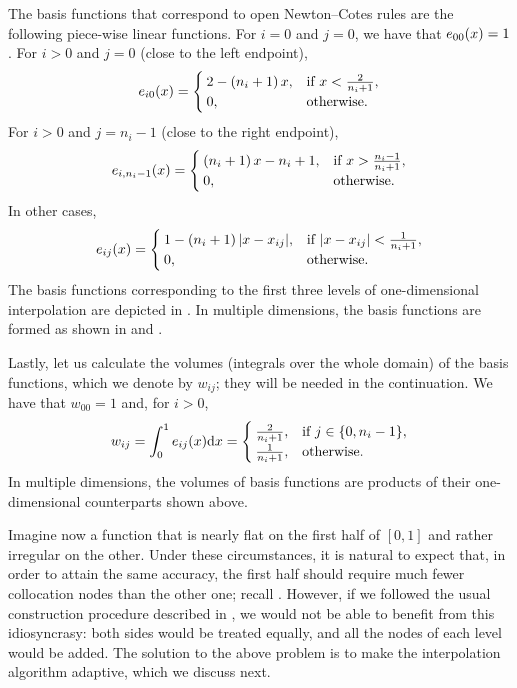 The basis functions that correspond to open Newton--Cotes rules are the
following piece-wise linear functions. For $i = 0$ and $j = 0$, we have that
$e_{00}(x) = 1$. For $i > 0$ and $j = 0$ (close to the left endpoint),
\[
  e_{i0}(x) =
  \begin{cases}
    2 - \left(n_i + 1\right) x, & \text{if } x < \frac{2}{n_i + 1}, \\
    0, & \text{otherwise}.
  \end{cases}
\]
For $i > 0$ and $j = n_i - 1$ (close to the right endpoint),
\[
  e_{i, n_i - 1}(x) =
  \begin{cases}
    \left(n_i + 1\right) x - n_i + 1, & \text{if } x > \frac{n_i - 1}{n_i + 1}, \\
    0, & \text{otherwise}.
  \end{cases}
\]
In other cases,
\[
  e_{ij}(x) =
  \begin{cases}
    1 - \left(n_i + 1\right)|x - x_{ij}|, & \text{if } |x - x_{ij}| < \frac{1}{n_i + 1}, \\
    0, & \text{otherwise}.
  \end{cases}
\]
The basis functions corresponding to the first three levels of one-dimensional
interpolation are depicted in . In multiple dimensions,
the basis functions are formed as shown in  and
.

Lastly, let us calculate the volumes (integrals over the whole domain) of the
basis functions, which we denote by $w_{ij}$; they will be needed in the
continuation. We have that $w_{00} = 1$ and, for $i > 0$,
\begin{equation} \elab{interpolant-basis-volume}
  w_{ij} = \int_0^1 e_{ij}(\x) \d \x =
  \begin{cases}
    \frac{2}{n_i + 1}, & \text{if } j \in \{ 0, n_i - 1 \}, \\
    \frac{1}{n_i + 1}, & \text{otherwise}.
  \end{cases}
\end{equation}
In multiple dimensions, the volumes of basis functions are products of
their one-dimensional counterparts shown above.

Imagine now a function that is nearly flat on the first half of $[0, 1]$ and
rather irregular on the other. Under these circumstances, it is natural to
expect that, in order to attain the same accuracy, the first half should require
much fewer collocation nodes than the other one; recall
. However, if we followed the usual construction
procedure described in , we would not be able to
benefit from this idiosyncrasy: both sides would be treated equally, and all the
nodes of each level would be added. The solution to the above problem is to make
the interpolation algorithm adaptive, which we discuss next.

